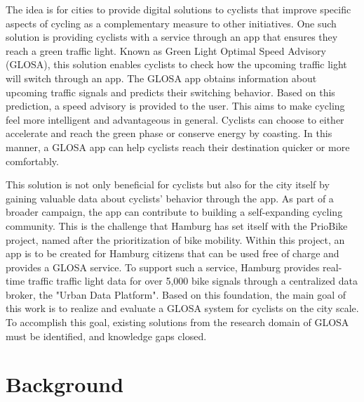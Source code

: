 The idea is for cities to provide digital solutions to cyclists that improve specific aspects of cycling as a complementary measure to other initiatives. One such solution is providing cyclists with a service through an app that ensures they reach a green traffic light. Known as Green Light Optimal Speed Advisory (GLOSA), this solution enables cyclists to check how the upcoming traffic light will switch through an app. The GLOSA app obtains information about upcoming traffic signals and predicts their switching behavior. Based on this prediction, a speed advisory is provided to the user. This aims to make cycling feel more intelligent and advantageous in general. Cyclists can choose to either accelerate and reach the green phase or conserve energy by coasting. In this manner, a GLOSA app can help cyclists reach their destination quicker or more comfortably.

This solution is not only beneficial for cyclists but also for the city itself by gaining valuable data about cyclists' behavior through the app. As part of a broader campaign, the app can contribute to building a self-expanding cycling community. This is the challenge that Hamburg has set itself with the PrioBike project, named after the prioritization of bike mobility. Within this project, an app is to be created for Hamburg citizens that can be used free of charge and provides a GLOSA service. To support such a service, Hamburg provides real-time traffic traffic light data for over 5,000 bike signals through a centralized data broker, the "Urban Data Platform". Based on this foundation, the main goal of this work is to realize and evaluate a GLOSA system for cyclists on the city scale. To accomplish this goal, existing solutions from the research domain of GLOSA must be identified, and knowledge gaps closed. 

\section{Background}

